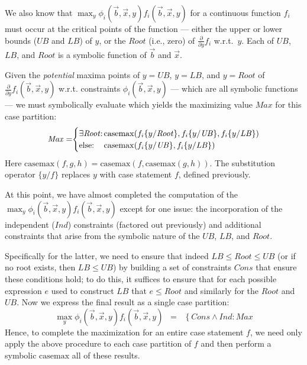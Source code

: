 \documentclass[twoside,11pt]{article}
\newcommand{\casemax}{\mathrm{casemax}}
\newcommand{\UB}{\mathit{UB}}
\newcommand{\LB}{\mathit{LB}}
\newcommand{\IND}{\mathit{Ind}}
\newcommand{\CONS}{\mathit{Cons}}
\newcommand{\Root}{\mathit{Root}}
\newcommand{\Max}{\mathit{Max}}
\newcommand{\sq}{\hspace{-1mm}}
\newcommand{\sqm}{\hspace{-2mm}}
\begin{document}
We also know that $\max_y \phi_i(\vec{b},\vec{x},y)
f_i(\vec{b},\vec{x},y)$ for a continuous function $f_i$ must occur at the critical points of the function --- 
either the upper or lower bounds ($\UB$ and $\LB$) of $y$, 
or the $\Root$ (i.e., zero) of $\frac{\partial}{\partial y} f_i$ 
w.r.t.\ $y$.  Each of $\UB$, $\LB$, and $\Root$
is a symbolic function of $\vec{b}$ and $\vec{x}$. 

Given the \emph{potential} maxima points of $y = \UB$, $y = \LB$, and
$y = \Root$ of $\frac{\partial}{\partial y} f_i(\vec{b},\vec{x},y)$
w.r.t. constraints $\phi_i(\vec{b},\vec{x},y)$ --- which are all
symbolic functions --- we must symbolically evaluate which yields the
maximizing value $\Max$ for this case partition:
\vspace{2mm}
{%
\begin{align*}
\Max =  \sq \begin{cases}
\mbox{$\exists \Root$}  \sq: \sq & \sqm \casemax( f_i \{ y / \Root \}, f_i \{ y / \UB \}, f_i \{ y / \LB \})\\
\mbox{else}  \sq:  \sq & \sqm \casemax( f_i \{ y / \UB \}, f_i \{ y / \LB \})
\end{cases}
\end{align*}}
Here $\casemax(f,g,h) = \casemax(f,\casemax(g,h))$.  The 
substitution operator $\{ y / f \}$ replaces $y$ with case statement $f$, 
defined previously.

At this point, we have almost completed the computation
of the $\max_y \phi_i(\vec{b},\vec{x},y) f_i(\vec{b},\vec{x},y)$
except for one issue: the incorporation of the independent ($\IND$) constraints
(factored out previously) and additional constraints that arise from the
symbolic nature of the $\UB$, $\LB$, and $\Root$.  

Specifically for the latter, we need to ensure that indeed $\LB \leq \Root \leq \UB$
(or if no root exists, then $\LB \leq \UB$) by building a set
of constraints $\CONS$ that ensure these conditions hold; to do this,
it suffices to ensure that for each possible expression $e$ used to
construct $\LB$ that $e \leq \Root$ and similarly for the $Root$ and $\UB$.
Now we express the final result as a single case partition:
\begin{equation*}
\max_y \phi_i(\vec{b},\vec{x},y) f_i(\vec{b},\vec{x},y) \;\; = \;\;
\left\{ \CONS \land \IND: \Max \right.
\end{equation*}
Hence, to complete the maximization for an entire case statement $f$, we need only apply the above procedure to each case partition of $f$ and then  perform a symbolic $\casemax$ all of these results.  
\end{document}

